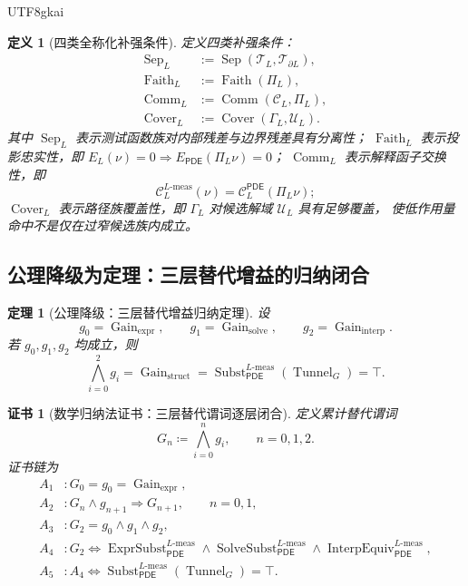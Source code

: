 \documentclass[12pt]{article}
\newtheorem{definition}{定义}[section]
\newtheorem{theorem}{定理}[section]
\newtheorem{Certificate}{证书}[section]
\newcommand{\DefEq}{\coloneqq}
\newcommand{\PDE}{\ensuremath{\mathsf{PDE}}}
\DeclareMathOperator{\Gain}{Gain}
\DeclareMathOperator{\Tunnel}{Tunnel}
\DeclareMathOperator{\Subst}{Subst}
\DeclareMathOperator{\ExprSubst}{ExprSubst}
\DeclareMathOperator{\SolveSubst}{SolveSubst}
\DeclareMathOperator{\InterpEquiv}{InterpEquiv}
\DeclareMathOperator{\Sep}{Sep}
\DeclareMathOperator{\Faith}{Faith}
\DeclareMathOperator{\Cover}{Cover}
\DeclareMathOperator{\Comm}{Comm}
\newcommand{\Lmeas}{L\text{-}\mathrm{meas}}
\begin{document}
\begin{CJK*}{UTF8}{gkai}
\begin{definition}[四类全称化补强条件]
\label{def:tex58-four-strengthening-conditions}
定义四类补强条件：
\[
\begin{aligned}
  \Sep_L &:=
  \Sep(\mathcal T_L,\mathcal T_{\partial L}),\\
  \Faith_L &:=
  \Faith(\Pi_L),\\
  \Comm_L &:=
  \Comm(\mathcal C_L,\Pi_L),\\
  \Cover_L &:=
  \Cover(\Gamma_L,\mathcal U_L).
\end{aligned}
\]
其中 \(\Sep_L\) 表示测试函数族对内部残差与边界残差具有分离性；
\(\Faith_L\) 表示投影忠实性，即 \(E_L(\nu)=0\Rightarrow E_{\PDE}(\Pi_L\nu)=0\)；
\(\Comm_L\) 表示解释函子交换性，即
\[
  \mathcal C_L^{\Lmeas}(\nu)
  =
  \mathcal C_L^{\PDE}(\Pi_L\nu);
\]
\(\Cover_L\) 表示路径族覆盖性，即 \(\Gamma_L\) 对候选解域 \(\mathcal U_L\) 具有足够覆盖，
使低作用量命中不是仅在过窄候选族内成立。
\end{definition}

\subsection{公理降级为定理：三层替代增益的归纳闭合}
\label{subsec:tex58-three-layer-gain-induction}

\begin{theorem}[公理降级：三层替代增益归纳定理]
\label{thm:tex58-three-layer-gain-induction}
设
\[
  g_0=\Gain_{\mathrm{expr}},
  \qquad
  g_1=\Gain_{\mathrm{solve}},
  \qquad
  g_2=\Gain_{\mathrm{interp}}.
\]
若 \(g_0,g_1,g_2\) 均成立，则
\[
  \bigwedge_{i=0}^{2}g_i
  =
  \Gain_{\mathrm{struct}}
  =
  \Subst_{\PDE}^{\Lmeas}(\Tunnel_G)=\top.
\]
\end{theorem}

\begin{Certificate}[数学归纳法证书：三层替代谓词逐层闭合]
\label{cert:tex58-three-layer-gain-induction}
定义累计替代谓词
\[
  G_n
  \DefEq
  \bigwedge_{i=0}^{n}g_i,
  \qquad
  n=0,1,2.
\]
证书链为
\[
\begin{aligned}
  A_1 &: G_0=g_0=\Gain_{\mathrm{expr}},\\
  A_2 &: G_n\wedge g_{n+1}\Rightarrow G_{n+1},\qquad n=0,1,\\
  A_3 &: G_2=g_0\wedge g_1\wedge g_2,\\
  A_4 &: G_2
  \Longleftrightarrow
  \ExprSubst_{\PDE}^{\Lmeas}
  \wedge
  \SolveSubst_{\PDE}^{\Lmeas}
  \wedge
  \InterpEquiv_{\PDE}^{\Lmeas},\\
  A_5 &: A_4
  \Longleftrightarrow
  \Subst_{\PDE}^{\Lmeas}(\Tunnel_G)=\top.
\end{aligned}
\]
\end{Certificate}


\end{CJK*}
\end{document}
